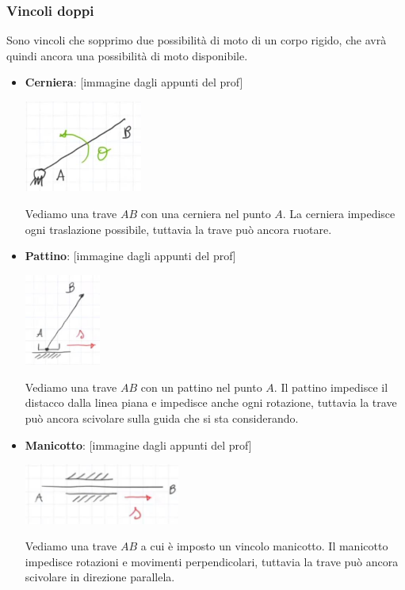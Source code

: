 \subsubsection{Vincoli doppi}
Sono vincoli che sopprimo due possibilità di moto di un corpo rigido, che avrà quindi ancora una possibilità di moto disponibile.
\begin{itemize}
    \item \textbf{Cerniera}: [immagine dagli appunti del prof]
    \begin{center}
        \includegraphics[height=3cm]{../lezione3/img6.JPG}
    \end{center}
    Vediamo una trave $AB$ con una cerniera nel punto $A$. La cerniera impedisce ogni traslazione possibile, tuttavia la trave può ancora ruotare.
    \item \textbf{Pattino}: [immagine dagli appunti del prof]
    \begin{center}
        \includegraphics[height=3cm]{../lezione3/img7.JPG}
    \end{center}
    Vediamo una trave $AB$ con un pattino nel punto $A$. Il pattino impedisce il distacco dalla linea piana e impedisce anche ogni rotazione, tuttavia la trave può ancora scivolare sulla guida che si sta considerando.
    \item \textbf{Manicotto}: [immagine dagli appunti del prof]
    \begin{center}
        \includegraphics[height=2cm]{../lezione3/img8.JPG}
    \end{center}
    Vediamo una trave $AB$ a cui è imposto un vincolo manicotto. Il manicotto impedisce rotazioni e movimenti perpendicolari, tuttavia la trave può ancora scivolare in direzione parallela.
\end{itemize}
